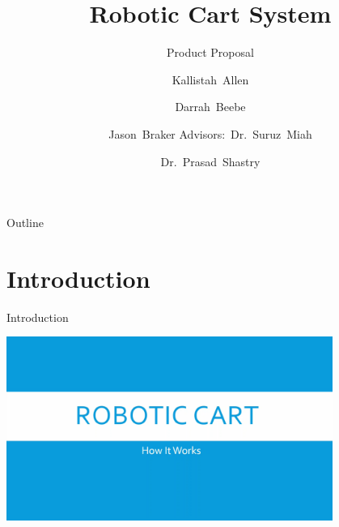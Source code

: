 \documentclass{beamer}
\title[Robotic Cart System (Proposal)]{Robotic Cart System}
\subtitle{Product Proposal}
\author[K.~Allen, D.~Beebe, J.~Braker]{Kallistah~Allen \and Darrah~Beebe \and
Jason~Braker
Advisors:~Dr.~Suruz~Miah \and Dr.~Prasad~Shastry}
\institute[Bradley University] %
{
  Department of Electrical and Computer Engineering\\
  Bradley University\\
  1501 W. Bradley Avenue\\
  Peoria, IL, 61625, USA
}
\begin{document}
\begin{frame}
  \titlepage
\end{frame}

\begin{frame}{Outline} 
  \tableofcontents%
\end{frame}

\section{Introduction}

\begin{frame}{Introduction}
  \begin{center}
    \href{videos/proposalVideo.mp4}{\includegraphics[width=0.8\textwidth]{figs/img/proposalVideoTitle}}
  \end{center}
\end{frame}
\end{document}
